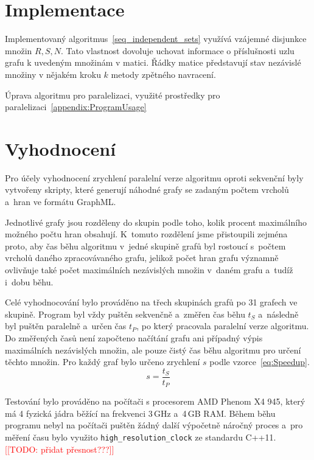 \documentclass[12pt]{article}
\newcommand{\todo}[1]{\textcolor{red}{[[TODO: #1]]}}
\begin{document}
\section{Implementace}

Implementovaný algoritmus~\ref{seq_independent_sets} využívá vzájemné disjunkce množin $R,S,N$. Tato vlastnost dovoluje uchovat informace o příslušnosti uzlu grafu k uvedeným množinám v matici. Řádky matice představují stav nezávislé množiny v nějakém kroku $k$ metody zpětného navracení. 
                                                           
Úprava algoritmu pro paralelizaci, využité prostředky pro paralelizaci~\ref{appendix:ProgramUsage}


\section{Vyhodnocení}
Pro účely vyhodnocení zrychlení paralelní verze algoritmu oproti sekvenční byly vytvořeny skripty, které generují náhodné grafy se zadaným počtem vrcholů a~hran ve formátu GraphML. 

Jednotlivé grafy jsou rozděleny do skupin podle toho, kolik procent maximálního možného počtu hran obsahují. K~tomuto rozdělení jsme přistoupili zejména proto, aby čas běhu algoritmu v~jedné skupině grafů byl rostoucí s~počtem vrcholů daného zpracovávaného grafu, jelikož počet hran grafu významně ovlivňuje také počet maximálních nezávislých množin v~daném grafu a~tudíž i~dobu běhu. 

Celé vyhodnocování bylo prováděno na třech skupinách grafů po 31 grafech ve skupině. Program byl vždy puštěn sekvenčně a~změřen čas běhu $t_S$ a~následně byl puštěn paralelně a~určen čas $t_P$, po který pracovala paralelní verze algoritmu. Do změřených časů není započteno načítání grafu ani případný výpis maximálních nezávislých množin, ale pouze čistý čas běhu algoritmu pro určení těchto množin. Pro každý graf bylo určeno zrychlení $s$ podle vzorce~\ref{eq:Speedup}.
\begin{equation}
    s = \frac{t_S}{t_P} \label{eq:Speedup}
\end{equation}

Testování bylo prováděno na počítači s procesorem AMD Phenom X4 945, který má 4 fyzická jádra běžící na frekvenci 3\,GHz a~4\,GB RAM. Během běhu programu nebyl na počítači puštěn žádný další výpočetně náročný proces a~pro měření času bylo využito \texttt{high\_resolution\_clock} ze standardu C++11. \todo{přidat přesnost???}
\end{document}
